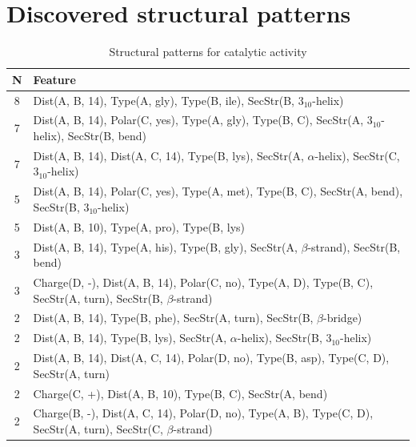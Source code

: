 \documentclass[11pt,twoside,a4paper]{book}
\begin{document}
\section{Discovered structural patterns}
\begin{table}\begin{tabularx}{\textwidth}{cX}\textbf{N} & \textbf{Feature} \\ \hline  
8 & Dist(A, B, 14),  Type(A, gly), Type(B, ile), SecStr(B, $3_{10}$-helix)\\ \hline 
7 & Dist(A, B, 14), Polar(C, yes),  Type(A, gly), Type(B, C), SecStr(A, $3_{10}$-helix), \newline SecStr(B, bend)\\ \hline 
7 & Dist(A, B, 14), Dist(A, C, 14),  Type(B, lys), SecStr(A, $\alpha$-helix), SecStr(C, $3_{10}$-helix)\\ \hline 
5 & Dist(A, B, 14), Polar(C, yes),  Type(A, met), Type(B, C), SecStr(A, bend), \newline SecStr(B, $3_{10}$-helix)\\ \hline 
5 & Dist(A, B, 10),  Type(A, pro), Type(B, lys)\\ \hline 
3 & Dist(A, B, 14),  Type(A, his), Type(B, gly), SecStr(A, $\beta$-strand), SecStr(B, bend)\\ \hline 
3 & Charge(D, -), Dist(A, B, 14), Polar(C, no),  Type(A, D), Type(B, C), SecStr(A, turn), SecStr(B, $\beta$-strand)\\ \hline 
2 & Dist(A, B, 14),  Type(B, phe), SecStr(A, turn), SecStr(B, $\beta$-bridge)\\ \hline 
2 & Dist(A, B, 14),  Type(B, lys), SecStr(A, $\alpha$-helix), SecStr(B, $3_{10}$-helix)\\ \hline 
2 & Dist(A, B, 14), Dist(A, C, 14), Polar(D, no),  Type(B, asp), Type(C, D), \newline SecStr(A, turn)\\ \hline 
2 & Charge(C, +), Dist(A, B, 10),  Type(B, C), SecStr(A, bend)\\ \hline 
2 & Charge(B, -), Dist(A, C, 14), Polar(D, no),  Type(A, B), Type(C, D), SecStr(A, turn), SecStr(C, $\beta$-strand)\\ \hline 
 \end{tabularx}\caption{Structural patterns for catalytic activity}\label{tab:catalytic_activity}\end{table}
\end{document}
